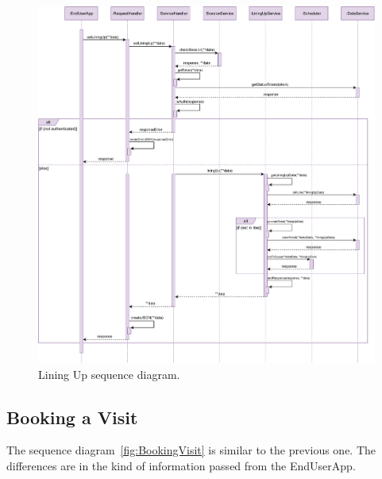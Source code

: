 \begin{figure}[H]
	\centering
	\includegraphics[width=1.0\textwidth]{images/liningUp_sequence_diagram.pdf}
	\caption{Lining Up sequence diagram.}\label{fig:LiningUp}
\end{figure}

\subsection{Booking a Visit}

The sequence diagram~\ref{fig:BookingVisit} is similar to the previous one.
The differences are in the kind of information passed from the EndUserApp.

